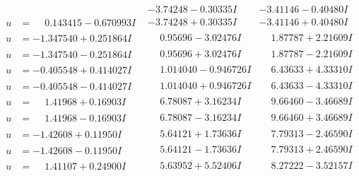 \documentclass[1p]{elsarticle_modified}
\theoremstyle{definition}
\begin{document}
$$\begin{array}{c|c|c}
 & -3.74248 - 0.30335 I & -3.41146 - 0.40480 I \\ \hline\begin{aligned}
u &= \phantom{-}0.143415 - 0.670993 I\end{aligned}
 & -3.74248 + 0.30335 I & -3.41146 + 0.40480 I \\ \hline\begin{aligned}
u &= -1.347540 + 0.251864 I\end{aligned}
 & \phantom{-}0.95696 - 3.02476 I & \phantom{-}1.87787 + 2.21609 I \\ \hline\begin{aligned}
u &= -1.347540 - 0.251864 I\end{aligned}
 & \phantom{-}0.95696 + 3.02476 I & \phantom{-}1.87787 - 2.21609 I \\ \hline\begin{aligned}
u &= -0.405548 + 0.414027 I\end{aligned}
 & \phantom{-}1.014040 - 0.946726 I & \phantom{-}6.43633 + 4.33310 I \\ \hline\begin{aligned}
u &= -0.405548 - 0.414027 I\end{aligned}
 & \phantom{-}1.014040 + 0.946726 I & \phantom{-}6.43633 - 4.33310 I \\ \hline\begin{aligned}
u &= \phantom{-}1.41968 + 0.16903 I\end{aligned}
 & \phantom{-}6.78087 + 3.16234 I & \phantom{-}9.66460 - 3.46689 I \\ \hline\begin{aligned}
u &= \phantom{-}1.41968 - 0.16903 I\end{aligned}
 & \phantom{-}6.78087 - 3.16234 I & \phantom{-}9.66460 + 3.46689 I \\ \hline\begin{aligned}
u &= -1.42608 + 0.11950 I\end{aligned}
 & \phantom{-}5.64121 + 1.73636 I & \phantom{-}7.79313 - 2.46590 I \\ \hline\begin{aligned}
u &= -1.42608 - 0.11950 I\end{aligned}
 & \phantom{-}5.64121 - 1.73636 I & \phantom{-}7.79313 + 2.46590 I \\ \hline\begin{aligned}
u &= \phantom{-}1.41107 + 0.24900 I\end{aligned}
 & \phantom{-}5.63952 + 5.52406 I & \phantom{-}8.27222 - 3.52157 I \\ \hline\begin{aligned}

\end{aligned}
\end{array}$$
\end{document}
